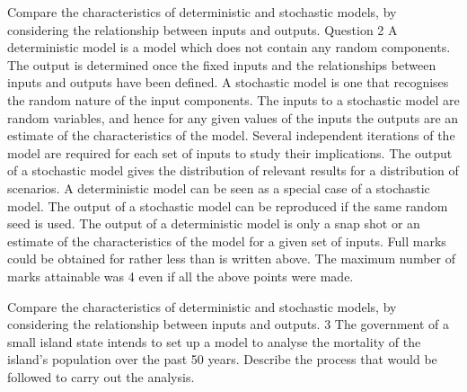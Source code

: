 \documentclass[a4paper,12pt]{article}
\begin{document}

Compare the characteristics of deterministic and stochastic models, by considering the
relationship between inputs and outputs.
Question 2
A deterministic model is a model which does not contain any random components.
The output is determined once the fixed inputs and the relationships between inputs and
outputs have been defined.
A stochastic model is one that recognises the random nature of the input components.
The inputs to a stochastic model are random variables, and hence for any given values of the
inputs the outputs are an estimate of the characteristics of the model.
Several independent iterations of the model are required for each set of inputs to study their
implications.
The output of a stochastic model gives the distribution of relevant results for a distribution
of scenarios.
A deterministic model can be seen as a special case of a stochastic model.
The output of a stochastic model can be reproduced if the same random seed is used.
The output of a deterministic model is only a snap shot or an estimate of the characteristics
of the model for a given set of inputs.
Full marks could be obtained for rather less than is written above. The maximum number
of marks attainable was 4 even if all the above points were made.

Compare the characteristics of deterministic and stochastic models, by considering the
relationship between inputs and outputs.
3 The government of a small island state intends to set up a model to analyse the
mortality of the island’s population over the past 50 years.
Describe the process that would be followed to carry out the analysis.
\end{document}
